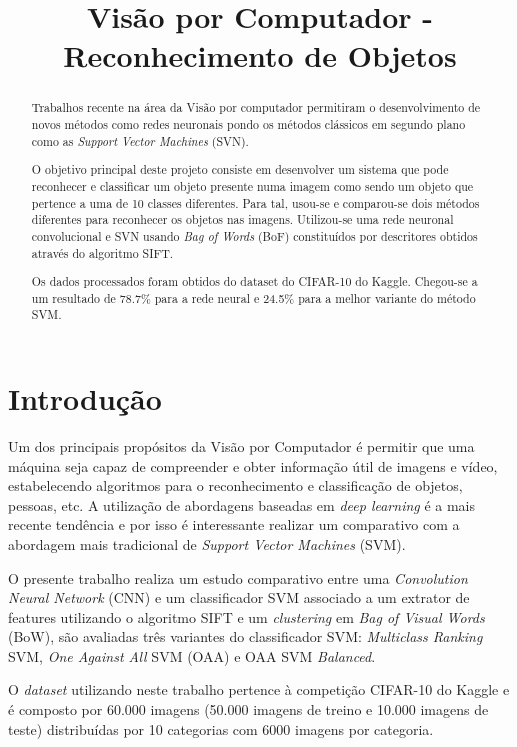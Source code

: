 \documentclass[extendedabs]{vcom}
\title{Visão por Computador - Reconhecimento de Objetos}
\begin{document}
\maketitle

\begin{abstract}
Trabalhos recente na área da Visão por computador permitiram o desenvolvimento de novos métodos como redes neuronais pondo os métodos clássicos em segundo plano como as \textit{Support Vector Machines} (SVN). 

O objetivo principal deste projeto consiste em desenvolver um sistema que pode reconhecer e classificar um objeto presente numa imagem como sendo um objeto que pertence a uma de 10 classes diferentes. Para tal, usou-se e comparou-se dois métodos diferentes para reconhecer os objetos nas imagens. Utilizou-se uma rede neuronal convolucional e SVN usando \textit{Bag of Words} (BoF) constituídos por descritores obtidos através do algoritmo SIFT. 

Os dados processados foram obtidos do dataset do CIFAR-10 do Kaggle. Chegou-se a um resultado de 78.7\% para a rede neural e 24.5\% para a melhor variante do método SVM.
\end{abstract}

\section{Introdução}
\label{sec:intro}
Um dos principais propósitos da Visão por Computador é permitir que uma máquina seja capaz de compreender e obter informação útil de imagens e vídeo, estabelecendo algoritmos para o reconhecimento e classificação de objetos, pessoas, etc. A utilização de abordagens baseadas em \textit{deep learning} é a mais recente tendência e por isso é interessante realizar um comparativo com a abordagem mais tradicional de \textit{Support Vector Machines} (SVM). 

O presente trabalho realiza um estudo comparativo entre uma \textit{Convolution Neural Network} (CNN) e um classificador SVM associado a um extrator de features utilizando o algoritmo SIFT e um \textit{clustering} em \textit{Bag of Visual Words} (BoW), são avaliadas três variantes do classificador SVM: \textit{Multiclass Ranking} SVM, \textit{One Against All} SVM (OAA) e OAA SVM \textit{Balanced}. 

O \textit{dataset} utilizando neste trabalho pertence à competição CIFAR-10 do Kaggle e é composto por 60.000 imagens (50.000 imagens de treino e 10.000 imagens de teste) distribuídas por 10 categorias com 6000 imagens por categoria.
\end{document}
